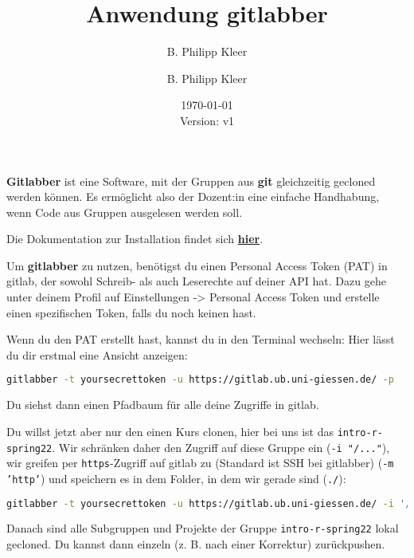 \documentclass[11pt,a4paper]{article}
\author{B. Philipp Kleer}
\title{%
  Anwendung gitlabber \\
  }
\author{B. Philipp Kleer}
\date{\today \\ \small{Version: v1}}
\begin{document}
\maketitle

\textbf{Gitlabber} ist eine Software, mit der Gruppen aus \textbf{git} gleichzeitig gecloned werden können. Es ermöglicht also der Dozent:in eine einfache Handhabung, wenn Code aus Gruppen ausgelesen werden soll. 

Die Dokumentation zur Installation findet sich \href{https://github.com/ezbz/gitlabber}{\textbf{hier}}.

Um \textbf{gitlabber} zu nutzen, benötigst du einen Personal Access Token (PAT) in gitlab, der sowohl Schreib- als auch Leserechte auf deiner API hat. Dazu gehe unter deinem Profil auf Einstellungen -> Personal Access Token und erstelle einen spezifischen Token, falls du noch keinen hast. 

Wenn du den PAT erstellt hast, kannst du in den Terminal wechseln: Hier lässt du dir erstmal eine Ansicht anzeigen:

\begin{lstlisting}[language=bash]
gitlabber -t yoursecrettoken -u https://gitlab.ub.uni-giessen.de/ -p
\end{lstlisting}

Du siehst dann einen Pfadbaum für alle deine Zugriffe in gitlab.

Du willst jetzt aber nur den einen Kurs clonen, hier bei uns ist das \texttt{intro-r-spring22}. Wir schränken daher den Zugriff auf diese Gruppe ein (\texttt{-i "/..."}), wir greifen per \texttt{https}-Zugriff auf gitlab zu (Standard ist SSH bei gitlabber) (\texttt{-m 'http'}) und speichern es in dem Folder, in dem wir gerade sind (\texttt{./}):
\begin{lstlisting}[language=bash]
gitlabber -t yoursecrettoken -u https://gitlab.ub.uni-giessen.de/ -i '/intro-r-spring22**' -m 'http' ./
\end{lstlisting}

Danach sind alle Subgruppen und Projekte der Gruppe \texttt{intro-r-spring22} lokal gecloned. Du kannst dann einzeln (z. B. nach einer Korrektur) zurückpushen. 
\end{document}
